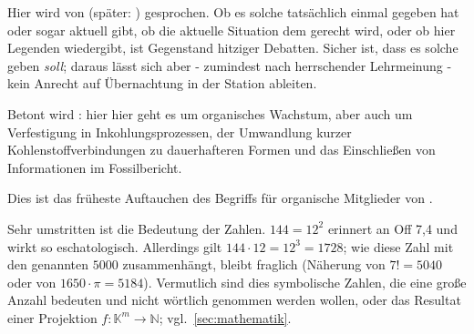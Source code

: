 \label{sec:carbon}


Hier wird  von  (später: ) gesprochen. 
Ob es solche tatsächlich einmal gegeben hat oder sogar aktuell gibt, ob die aktuelle Situation dem gerecht wird,
oder ob  hier Legenden wiedergibt, ist Gegenstand hitziger Debatten. 
Sicher ist, dass es solche geben \emph{soll}; daraus lässt sich aber - zumindest nach herrschender Lehrmeinung - kein Anrecht auf Übernachtung in der Station ableiten.

Betont wird : hier hier geht es um organisches Wachstum, aber auch um Verfestigung in Inkohlungsprozessen, der Umwandlung kurzer Kohlenstoffverbindungen zu dauerhafteren Formen und das Einschließen von Informationen im Fossilbericht.


Dies ist das früheste Auftauchen des Begriffs  für organische Mitglieder von .

Sehr umstritten ist die Bedeutung der Zahlen. $144=12^2$ erinnert an Off 7,4 und wirkt so eschatologisch. Allerdings gilt $144\cdot12=12^3=1728$; wie diese Zahl mit den genannten $5000$  zusammenhängt, bleibt fraglich (Näherung von $7!= 5040$ oder von $1650\cdot\pi = 5184$). Vermutlich sind dies symbolische Zahlen, die eine große Anzahl bedeuten und nicht wörtlich genommen werden wollen, oder das Resultat einer Projektion $f: \mathbb{K}^m\rightarrow\mathbb{N}$; vgl.~\cref{sec:mathematik}.

